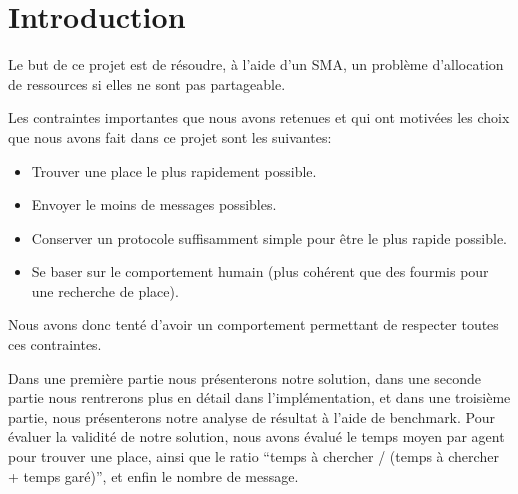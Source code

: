 
\section*{Introduction}
\label{sec:intro}

Le but de ce projet est de résoudre, à l'aide d'un SMA, un problème
d'allocation de ressources si elles ne sont pas partageable.

Les contraintes importantes que nous avons retenues et qui ont
motivées les choix que nous avons fait dans ce projet sont les
suivantes:

\begin{itemize}
\item Trouver une place le plus rapidement possible.
\item Envoyer le moins de messages possibles.
\item Conserver un protocole suffisamment simple pour être le plus
  rapide possible.
\item Se baser sur le comportement humain (plus cohérent que des
  fourmis pour une recherche de place).
\end{itemize}

Nous avons donc tenté d'avoir un comportement permettant de respecter
toutes ces contraintes.

Dans une première partie nous présenterons notre solution, dans une
seconde partie nous rentrerons plus en détail dans l'implémentation,
et dans une troisième partie, nous présenterons notre analyse de
résultat à l'aide de benchmark. Pour évaluer la validité de notre
solution, nous avons évalué le temps moyen par agent pour trouver une
place, ainsi que le ratio ``temps à chercher / (temps à chercher +
temps garé)'', et enfin le nombre de message.

